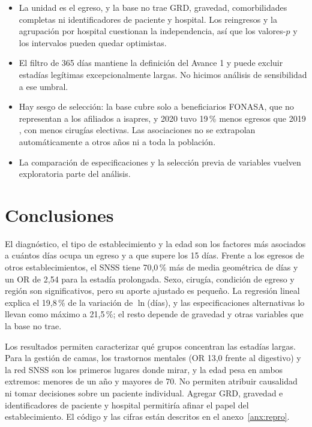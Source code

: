 \documentclass[10.5pt,a4paper,headings=small,abstract=false,bibliography=totoc,listof=totoc]{scrartcl}
\newcommand{\pct}{\,\%}
\newcommand{\anexo}[1]{anexo~\ref{#1}}
\begin{document}
\begin{itemize}\setlength\itemsep{0pt}
\item La unidad es el egreso, y la base no trae GRD, gravedad, comorbilidades completas ni identificadores de paciente y hospital. Los reingresos y la agrupación por hospital cuestionan la independencia, así que los valores-$p$ y los intervalos pueden quedar optimistas.
\item El filtro de 365 días mantiene la definición del Avance 1 y puede excluir estadías legítimas excepcionalmente largas. No hicimos análisis de sensibilidad a ese umbral.
\item Hay sesgo de selección: la base cubre solo a beneficiarios FONASA, que no representan a los afiliados a isapres, y 2020 tuvo 19\pct{} menos egresos que 2019 \citep{barahona2021}, con menos cirugías electivas. Las asociaciones no se extrapolan automáticamente a otros años ni a toda la población.
\item La comparación de especificaciones y la selección previa de variables vuelven exploratoria parte del análisis.
\end{itemize}

\section{Conclusiones}

El diagnóstico, el tipo de establecimiento y la edad son los factores más asociados a cuántos días ocupa un egreso y a que supere los 15 días. Frente a los egresos de otros establecimientos, el SNSS tiene 70,0\pct{} más de media geométrica de días y un OR de 2,54 para la estadía prolongada. Sexo, cirugía, condición de egreso y región son significativos, pero su aporte ajustado es pequeño. La regresión lineal explica el 19,8\pct{} de la variación de $\ln$(días), y las especificaciones alternativas lo llevan como máximo a 21,5\pct{}; el resto depende de gravedad y otras variables que la base no trae.

Los resultados permiten caracterizar qué grupos concentran las estadías largas. Para la gestión de camas, los trastornos mentales (OR 13,0 frente al digestivo) y la red SNSS son los primeros lugares donde mirar, y la edad pesa en ambos extremos: menores de un año y mayores de 70. No permiten atribuir causalidad ni tomar decisiones sobre un paciente individual. Agregar GRD, gravedad e identificadores de paciente y hospital permitiría afinar el papel del establecimiento. El código y las cifras están descritos en el \anexo{anx:repro}.\label{fincuerpo}
\end{document}
